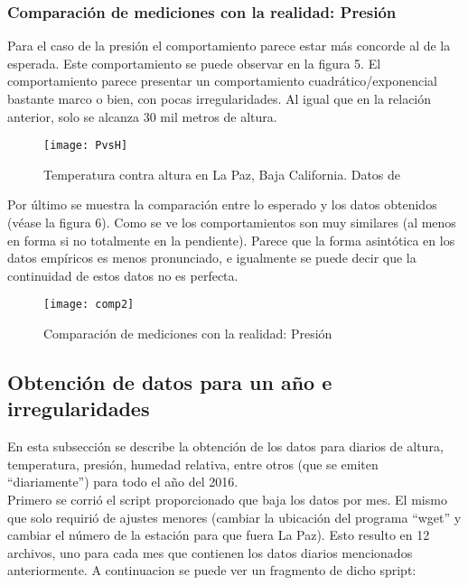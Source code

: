 \documentclass[12pt,letterpaper]{article}
\begin{document}
\subsubsection{Comparación de mediciones con la realidad: Presión}

Para el caso de la presión el comportamiento parece estar más concorde al de la esperada. Este comportamiento se puede observar en la figura 5. El comportamiento parece presentar un comportamiento cuadrático/exponencial bastante marco o bien, con pocas irregularidades. Al igual que en la relación anterior, solo se alcanza 30 mil metros de altura.\\

\begin{figure}[H]
	\centering
	\texttt{[image: PvsH]}
	\caption{Temperatura contra altura en La Paz, Baja California. Datos de\cite{a}}
\end{figure}

Por último se muestra la comparación entre lo esperado y los datos obtenidos (véase la figura 6). Como se ve los comportamientos son muy similares (al menos en forma si no totalmente en la pendiente).  Parece que la forma asintótica en los datos empíricos es menos pronunciado, e igualmente se puede decir que la continuidad de estos datos no es perfecta. \\

\begin{figure}[H]
	\centering
	\texttt{[image: comp2]}
	\caption{Comparación de mediciones con la realidad: Presión\cite{a}}
\end{figure}

\subsection{Obtención de datos para un año e irregularidades}

En esta subsección se describe la obtención de los datos para diarios de altura, temperatura, presión, humedad relativa, entre otros (que se emiten “diariamente”) para todo el año del 2016. \\

Primero se corrió el script proporcionado que baja los datos por mes. El mismo que solo requirió de ajustes menores (cambiar la ubicación del programa “wget” y cambiar el número de la estación para que fuera La Paz). Esto resulto en 12 archivos, uno para cada mes que contienen los datos diarios mencionados anteriormente. A continuacion se puede ver un fragmento de dicho spript:\\
\end{document}
